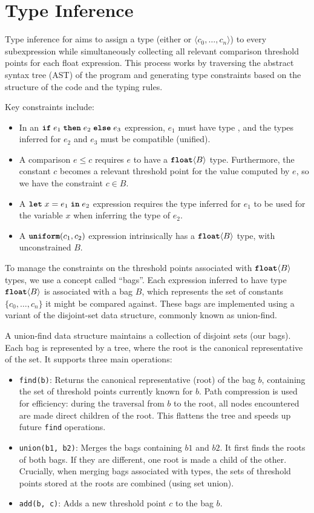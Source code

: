 \documentclass[nonacm,anonymous]{acmart}
\newcommand{\letkw}{\text{\ttfamily\bfseries let}}
\newcommand{\inkw}{\text{\ttfamily\bfseries in}}
\newcommand{\ifkw}{\text{\ttfamily\bfseries if}}
\newcommand{\thenkw}{\text{\ttfamily\bfseries then}}
\newcommand{\elsekw}{\text{\ttfamily\bfseries else}}
\newcommand{\uniform}{\text{\ttfamily\bfseries uniform}}
\newcommand{\bool}{\text{\ttfamily\bfseries bool}}
\newcommand{\float}{\text{\ttfamily\bfseries float}}
\newcommand{\CDice}{\text{\scshape CDice}\xspace}
\begin{document}
\section{Type Inference}

Type inference for \CDice aims to assign a type (either \bool{} or \float$\langle c_0, \dots, c_n \rangle$) to every subexpression while simultaneously collecting all relevant comparison threshold points for each float expression. This process works by traversing the abstract syntax tree (AST) of the program and generating type constraints based on the structure of the code and the typing rules.

Key constraints include:
\begin{itemize}
    \item In an $\ifkw \; e_1\; \thenkw \; e_2\; \elsekw \; e_3$ expression, $e_1$ must have type \bool, and the types inferred for $e_2$ and $e_3$ must be compatible (unified).
    \item A comparison $e \leq c$ requires $e$ to have a $\float\langle B \rangle$ type. Furthermore, the constant $c$ becomes a relevant threshold point for the value computed by $e$, so we have the constraint $c \in B$.
    \item A $\letkw \; x = e_1 \; \inkw \; e_2$ expression requires the type inferred for $e_1$ to be used for the variable $x$ when inferring the type of $e_2$.
    \item A $\uniform(c_1, c_2)$ expression intrinsically has a $\float\langle B \rangle$ type, with unconstrained $B$.
\end{itemize}

To manage the constraints on the threshold points associated with $\float\langle B \rangle$ types, we use a concept called ``bags''. Each expression inferred to have type $\float\langle B \rangle$ is associated with a bag $B$, which represents the set of constants $\{c_0, \dots, c_n\}$ it might be compared against. These bags are implemented using a variant of the disjoint-set data structure, commonly known as union-find.

A union-find data structure maintains a collection of disjoint sets (our bags). Each bag is represented by a tree, where the root is the canonical representative of the set. It supports three main operations:
\begin{itemize}
    \item \texttt{find(b)}: Returns the canonical representative (root) of the bag $b$, containing the set of threshold points currently known for $b$. Path compression is used for efficiency: during the traversal from $b$ to the root, all nodes encountered are made direct children of the root. This flattens the tree and speeds up future \texttt{find} operations.
    \item \texttt{union(b1, b2)}: Merges the bags containing $b1$ and $b2$. It first finds the roots of both bags. If they are different, one root is made a child of the other. Crucially, when merging bags associated with \float{} types, the sets of threshold points stored at the roots are combined (using set union).
    \item \texttt{add(b, c)}: Adds a new threshold point $c$ to the bag $b$.
\end{itemize}
\end{document}
